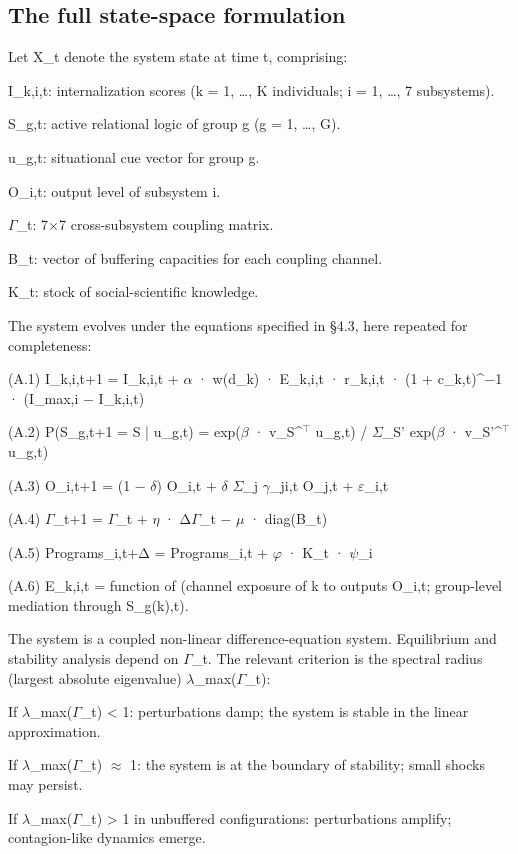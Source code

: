 \documentclass[12pt,a4paper]{article}
\begin{document}
\subsection{The full state-space formulation}

Let X_t denote the system state at time t, comprising:


I_{k,i,t}: internalization scores (k = 1, …, K individuals; i = 1, …, 7 subsystems).

S_{g,t}: active relational logic of group g (g = 1, …, G).

u_{g,t}: situational cue vector for group g.

O_{i,t}: output level of subsystem i.

$\Gamma$_t: 7×7 cross-subsystem coupling matrix.

B_t: vector of buffering capacities for each coupling channel.

K_t: stock of social-scientific knowledge.


The system evolves under the equations specified in §4.3, here repeated for completeness:


(A.1) I_{k,i,t+1} = I_{k,i,t} + $\alpha$ · w(d_k) · E_{k,i,t} · r_{k,i,t} · (1 + c_{k,t})^{−1} · (I_max,i − I_{k,i,t})


(A.2) P(S_{g,t+1} = S | u_{g,t}) = exp($\beta$ · v_S^$^\top$ u_{g,t}) / $\Sigma$_{S'} exp($\beta$ · v_{S'}^$^\top$ u_{g,t})


(A.3) O_{i,t+1} = (1 − $\delta$) O_{i,t} + $\delta$ $\Sigma$_j $\gamma$_{ji,t} O_{j,t} + $\varepsilon$_{i,t}


(A.4) $\Gamma$_{t+1} = $\Gamma$_t + $\eta$ · Δ$\Gamma$_t − $\mu$ · diag(B_t)


(A.5) Programs_{i,t+Δ} = Programs_{i,t} + $\varphi$ · K_t · $\psi$_i


(A.6) E_{k,i,t} = function of (channel exposure of k to outputs O_{i,t}; group-level mediation through S_{g(k),t}).


The system is a coupled non-linear difference-equation system. Equilibrium and stability analysis depend on $\Gamma$_t. The relevant criterion is the spectral radius (largest absolute eigenvalue) $\lambda$_max($\Gamma$_t):


If $\lambda$_max($\Gamma$_t) < 1: perturbations damp; the system is stable in the linear approximation.

If $\lambda$_max($\Gamma$_t) $\approx$ 1: the system is at the boundary of stability; small shocks may persist.

If $\lambda$_max($\Gamma$_t) > 1 in unbuffered configurations: perturbations amplify; contagion-like dynamics emerge.
\end{document}
